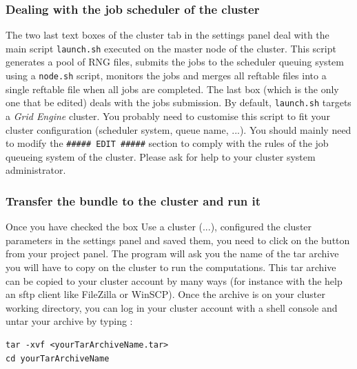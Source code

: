 \subsubsection{Dealing with the job scheduler of the cluster}

The two last text boxes of the cluster tab in the settings panel deal
with the main script \texttt{launch.sh} executed on the master node
of the cluster. This script generates a pool of RNG files, submits
the jobs to the scheduler queuing system using a \texttt{node.sh}
script, monitors the jobs and merges all reftable files into a single
reftable file when all jobs are completed. The last box (which is
the only one that be edited) deals with the jobs submission. By default,
\texttt{launch.sh} targets a \textit{Grid Engine} cluster. You probably
need to customise this script to fit your cluster configuration (scheduler
system, queue name, ...). You should mainly need to modify the \texttt{\#\#\#\#\#
EDIT \#\#\#\#\#} section to comply with the rules of the job queueing
system of the cluster. Please ask for help to your cluster system
administrator.


\subsubsection{Transfer the bundle to the cluster and run it}

\label{clusterrun} Once you have checked the box \textsf{Use a cluster
(...)}, configured the cluster parameters in the settings panel and
saved them, you need to click on the 
button from your project panel. The program will ask you the name
of the tar archive you will have to copy on the cluster to run the
computations. This tar archive can be copied to your cluster account
by many ways (for instance with the help an sftp client like FileZilla
or WinSCP). Once the archive is on your cluster working directory,
you can log in your cluster account with a shell console and untar
your archive by typing :\\
\begin{minipage}[c]{0.9\textwidth}%

\begin{lstlisting}
tar -xvf <yourTarArchiveName.tar>
cd yourTarArchiveName
\end{lstlisting}
%
\end{minipage}\\



